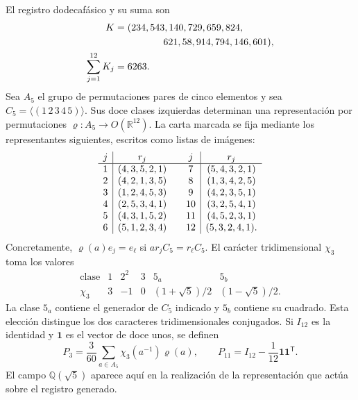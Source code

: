 \documentclass[a4paper,10pt]{article}
\theoremstyle{definition}\newtheorem{definition}[theorem]{Definición}
\theoremstyle{remark}\newtheorem{remark}[theorem]{Observación}
\numberwithin{equation}{section}
\begin{document}
El registro dodecafásico y su suma son
\begin{equation}
 \begin{split}
 K={}&(234,543,140,729,659,824,\\
     &\hspace{13mm}621,58,914,794,146,601),\\
 \sum_{j=1}^{12}K_j={}&6263.
 \end{split}
 \label{eq:leech-K}
\end{equation}
Sea \(A_5\) el grupo de permutaciones pares de cinco elementos y sea
\(C_5=\langle(1\,2\,3\,4\,5)\rangle\). Sus doce clases izquierdas
determinan una representación por permutaciones
\(\varrho:A_5\to O(\mathbb R^{12})\). La carta marcada se fija mediante
los representantes siguientes, escritos como listas de imágenes:
\[
\begin{array}{c|c@{\qquad}c|c}
j&r_j&j&r_j\\ \hline
1&(4,3,5,2,1)&7&(5,4,3,2,1)\\
2&(4,2,1,3,5)&8&(1,3,4,2,5)\\
3&(1,2,4,5,3)&9&(4,2,3,5,1)\\
4&(2,5,3,4,1)&10&(3,2,5,4,1)\\
5&(4,3,1,5,2)&11&(4,5,2,3,1)\\
6&(5,1,2,3,4)&12&(5,3,2,4,1).
\end{array}
\]
Concretamente, \(\varrho(a)e_j=e_\ell\) si
\(ar_jC_5=r_\ell C_5\). El carácter tridimensional \(\chi_3\) toma
los valores
\[
\begin{array}{c|ccccc}
\text{clase}&1&2^2&3&5_a&5_b\\ \hline
\chi_3&3&-1&0&(1+\sqrt5)/2&(1-\sqrt5)/2.
\end{array}
\]
La clase \(5_a\) contiene el generador de \(C_5\) indicado y \(5_b\)
contiene su cuadrado. Esta elección distingue los dos caracteres
tridimensionales conjugados. Si \(I_{12}\) es la identidad y
\(\mathbf1\) es el vector de doce unos, se definen
\begin{equation}
 P_3=\frac3{60}\sum_{a\in A_5}\chi_3(a^{-1})\varrho(a),
 \qquad
 P_{11}=I_{12}-\frac1{12}\mathbf1\mathbf1^{\mathsf T}.
 \label{eq:leech-projectors}
\end{equation}
El campo \(\mathbb Q(\sqrt5)\) aparece aquí en la realización de la
representación que actúa sobre el registro generado.
\end{document}
